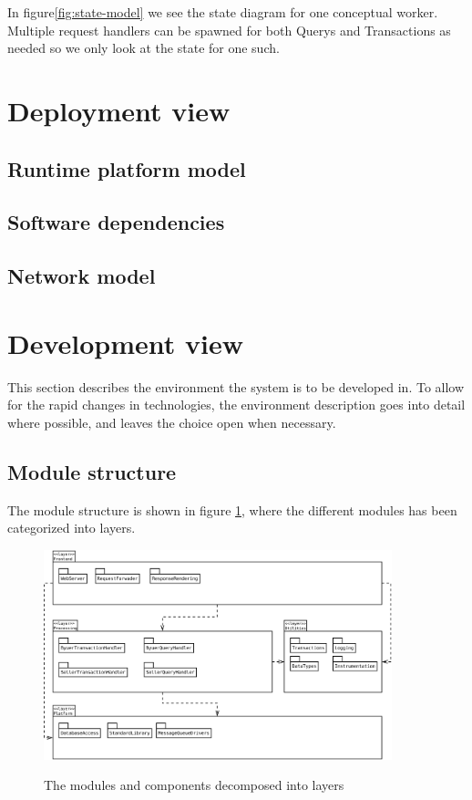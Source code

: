 In figure\ref{fig:state-model} we see the state diagram for one conceptual
worker. Multiple request handlers can be spawned for both Querys and
Transactions as needed so we only look at the state for one such.
\section{Deployment view}
\label{sec:deployment-view}


\subsection{Runtime platform model}
\label{sec:runt-platf-model}



\subsection{Software dependencies}
\label{sec:softw-depend}


\subsection{Network model}
\label{sec:network-model}


\section{Development view}
\label{sec:development-view}
This section describes the environment the system is to be developed in. To
allow for the rapid changes in technologies, the environment description goes
into detail where possible, and leaves the choice open when necessary.

\subsection{Module structure}
\label{sec:module-structure}
The module structure is shown in figure \ref{fig:dev_module_structure}, where
the different modules has been categorized into layers.

\begin{figure}[ht]
    \centering
    \includegraphics[width=0.9\textwidth]{figures/dev_module_structure}
    \label{fig:dev_module_structure}
    \caption{The modules and components decomposed into layers}
\end{figure}

